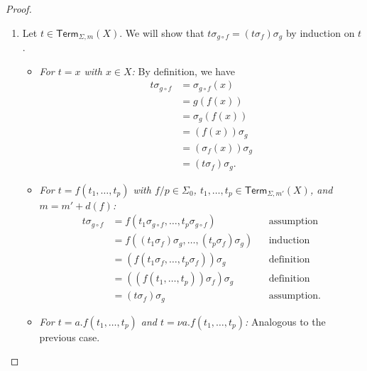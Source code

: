 \documentclass[11pt,a4paper]{amsart}
\newcommand{\Term}{\mathsf{Term}}
\newcommand{\sig}{\Sigma}
\newcommand{\sigp}{\Sigma_0}
\theoremstyle{plain}
\newcommand{\id}{\mathit{id}}
\numberwithin{equation}{section}
\newcommand{\+}[1]{\mathcal{#1}\xspace}
\theoremstyle{definition}
\begin{document}
\begin{proof}
\begin{enumerate}[wide]
            As seen in \eqref{itm:freemodelfunctorequivariance}, we have \((F\id_X)_i([t]_m) = \llbracket t \rrbracket^\kappa_m\) for \(\kappa: X \to (FX)\) with \(\kappa(x) = \llbracket \id_X(x) \rrbracket^{\eta_X}_0 = \llbracket x \rrbracket^{\eta_X}_0 = \eta_X(x)\).
            Thus, \(\kappa = \eta_X\) and it follows from \cref{thm:canonicalenvironmentevaluation} that \((F\id_X)_i([t]_m) = [t]_m = \id([t]_m)\).
        \item
            Let \(t \in \Term_{\sig, m}(X)\).
            We will show that \(t\sigma_{g \circ f} = (t\sigma_f)\sigma_g\) by induction on \(t\).
            \begin{itemize}
                \item
                    \textit{For \(t = x\) with \(x \in X\):}
                    By definition, we have
                    \begin{align*}
                        t\sigma_{g \circ f}
                        &= \sigma_{g \circ f}(x) \\
                        &= g(f(x)) \\
                        &= \sigma_g(f(x)) \\
                        &= (f(x))\sigma_g \\
                        &= (\sigma_f(x))\sigma_g \\
                        &= (t\sigma_f)\sigma_g.
                    \end{align*}
                \item
                    \textit{For \(t = f(t_1, \ldots, t_p)\) with \(f/p \in \sigp\), \(t_1, \ldots, t_p \in \Term_{\sig, m'}(X)\), and \(m = m' + d(f)\):}
                    \begin{align*}
                        t\sigma_{g \circ f}
                        &= f(t_1\sigma_{g \circ f}, \ldots, t_p\sigma_{g \circ f}) && \text{assumption} \\
                        &= f((t_1\sigma_f)\sigma_g, \ldots, (t_p\sigma_f)\sigma_g) && \text{induction} \\
                        &= (f(t_1\sigma_f, \ldots, t_p\sigma_f))\sigma_g && \text{definition} \\
                        &= ((f(t_1, \ldots, t_p))\sigma_f)\sigma_g && \text{definition} \\
                        &= (t\sigma_f)\sigma_g && \text{assumption}.
                    \end{align*}
                \item
                    \textit{For \(t = a.f(t_1, \ldots, t_p)\) and \(t = \nu a.f(t_1, \ldots, t_p)\):}
                    Analogous to the previous case.
            \end{itemize}


\end{enumerate}
\end{proof}
\end{document}
